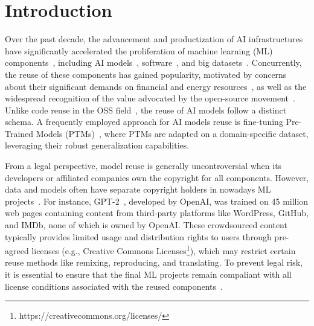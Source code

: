 \section{Introduction}
Over the past decade, the advancement and productization of AI infrastructures have significantly accelerated the proliferation of machine learning (ML) components~\cite{jiang2023empirical}, including AI models~\cite{rombach2022high, touvron2023llama}, software~\cite{wolf2020transformers, he2022fastermoe}, and big datasets~\cite{gao2020the, schuhmann2022laion}.
Concurrently, the reuse of these components has gained popularity, motivated by concerns about their significant demands on financial and energy resources~\cite{strubell2019energy}, as well as the widespread recognition of the value advocated by the open-source movement~\cite{rosen2005open}.
Unlike code reuse in the OSS field~\cite{perens1999open}, the reuse of AI models follow a distinct schema.
A frequently employed approach for AI models reuse is fine-tuning Pre-Trained Models (PTMs)~\cite{han2021pre, touvron2023llama}, where PTMs are adapted on a domain-specific dataset, leveraging their robust generalization capabilities. 

From a legal perspective, model reuse is generally uncontroversial when its developers or affiliated companies own the copyright for all components.
However, data and models often have separate copyright holders in nowadays ML projects~\cite{rajbahadur2021can, radford2019language, scao2022bloom, zeng2023glm}.
For instance, GPT-2~\cite{radford2019language}, developed by OpenAI, was trained on 45 million web pages containing content from third-party platforms like WordPress, GitHub, and IMDb, none of which is owned by OpenAI.
These crowdsourced content typically provides limited usage and distribution rights to users through pre-agreed licenses (e.g., Creative Commons Licenses\footnote{https://creativecommons.org/licenses/}), which may restrict certain reuse methods like remixing, reproducing, and translating. 
To prevent legal risk, it is essential to ensure that the final ML projects remain compaliant with all license conditions associated with the reused components~\cite{cui2023empirical, mathur2012empirical, kapitsaki2017automating}.

